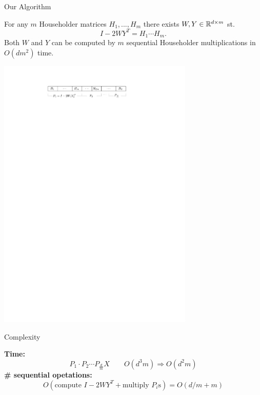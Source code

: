 \begin{frame}{Our Algorithm}

	\begin{lemma}
		\cite{wydec} For any $m$ Householder matrices $H_1,...,H_m$ there exists $W,Y\in \mathbb{R}^{d\times m}$ st. 
		$$I-2WY^T = H_1 \cdots H_m. $$
		Both $W$ and $Y$ can be computed by $m$ sequential Householder multiplications in $O(dm^2)$ time. 
	\end{lemma}

	\begin{center}
		\includegraphics[width=0.7\textwidth, page=1]{graphics}
	\end{center}

\end{frame}

\begin{frame}{Complexity}

		\textbf{Time:} 
		$$P_1 \cdot P_2 \cdots P_{\frac{d}{m}} X \qquad O(d^3m) \Rightarrow O(d^2m) $$
		\textbf{\# sequential opetations:} 
		$$O(\text{compute }I-2WY^T + \text{multiply }P_i\text{s}) = O(d/m + m)$$

\end{frame}

